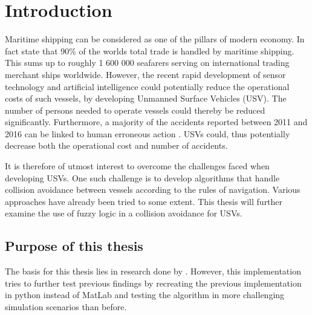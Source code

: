 

\chapter{Introduction} %

\label{Introduction} %


\newcommand{\keyword}[1]{\textbf{#1}}
\newcommand{\tabhead}[1]{\textbf{#1}}
\newcommand{\code}[1]{\texttt{#1}}
\newcommand{\file}[1]{\texttt{\bfseries#1}}
\newcommand{\option}[1]{\texttt{\itshape#1}}


Maritime shipping can be considered as one of the pillars of modern economy. In fact \textcite{percent_trade} state that 90\% of the worlds total trade is handled by maritime shipping. This sums up to roughly 1 600 000 seafarers serving on international trading merchant ships worldwide. However, the recent rapid development of sensor technology and artificial intelligence could potentially reduce the operational costs of such vessels, by developing Unmanned Surface Vehicles (USV). The number of persons needed to operate vessels could thereby be reduced significantly. Furthermore, a majority of the accidents reported between 2011 and 2016 can be linked to human erroneous action \cite{marine_casualities_incidents_2017}. USVs could, thus potentially decrease both the operational cost and number of accidents.

It is therefore of utmost interest to overcome the challenges faced when developing USVs. One such challenge is to develop algorithms that handle collision avoidance between vessels according to the rules of navigation. Various approaches have already been tried to some extent. This thesis will further examine the use of  fuzzy logic in a collision avoidance for USVs.
\section{Purpose of this thesis}
The basis for this thesis lies in research done by \textcite{perera2012intelligent}. However, this implementation tries to further test previous findings by recreating the previous implementation in python instead of MatLab and testing the algorithm in more challenging simulation scenarios than before.

